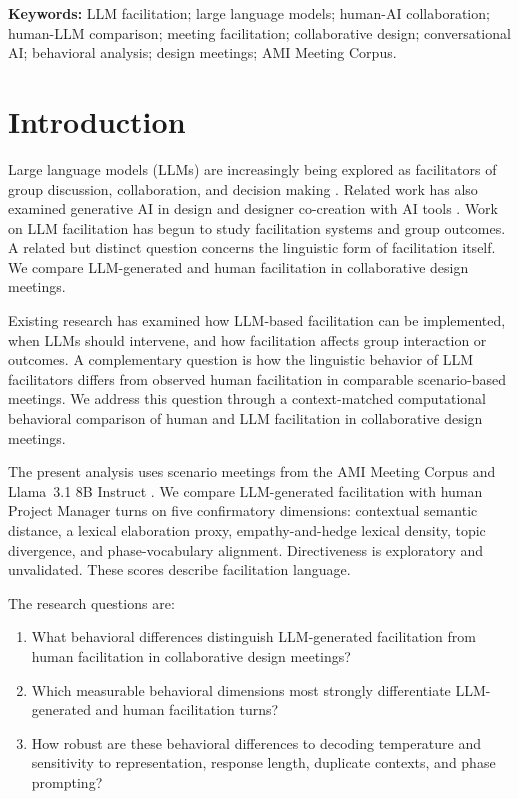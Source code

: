 \documentclass[11pt]{article}
\begin{document}
\noindent\textbf{Keywords:} LLM facilitation; large language models; human-AI collaboration; human-LLM comparison; meeting facilitation; collaborative design; conversational AI; behavioral analysis; design meetings; AMI Meeting Corpus.

\section{Introduction}
Large language models (LLMs) are increasingly being explored as facilitators of group discussion, collaboration, and decision making \citep{korre2025, dong2024facilitation, alsobay2026table}. Related work has also examined generative AI in design \citep{peng2025} and designer co-creation with AI tools \citep{gmeiner2023}. Work on LLM facilitation has begun to study facilitation systems and group outcomes. A related but distinct question concerns the linguistic form of facilitation itself. We compare LLM-generated and human facilitation in collaborative design meetings.

Existing research has examined how LLM-based facilitation can be implemented, when LLMs should intervene, and how facilitation affects group interaction or outcomes. A complementary question is how the linguistic behavior of LLM facilitators differs from observed human facilitation in comparable scenario-based meetings. We address this question through a context-matched computational behavioral comparison of human and LLM facilitation in collaborative design meetings.

The present analysis uses scenario meetings from the AMI Meeting Corpus \citep{carletta2005ami} and Llama~3.1 8B Instruct \citep{dubey2024llama3}. We compare LLM-generated facilitation with human Project Manager turns on five confirmatory dimensions: contextual semantic distance, a lexical elaboration proxy, empathy-and-hedge lexical density, topic divergence, and phase-vocabulary alignment. Directiveness is exploratory and unvalidated. These scores describe facilitation language.

The research questions are:
\begin{enumerate}
\item What behavioral differences distinguish LLM-generated facilitation from human facilitation in collaborative design meetings?
\item Which measurable behavioral dimensions most strongly differentiate LLM-generated and human facilitation turns?
\item How robust are these behavioral differences to decoding temperature and sensitivity to representation, response length, duplicate contexts, and phase prompting?
\end{enumerate}
\end{document}
